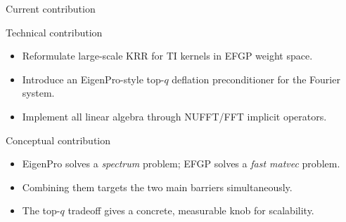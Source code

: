 \documentclass[aspectratio=169,11pt]{ctexbeamer}
\begin{document}
\begin{frame}{Current contribution}
\begin{block}{Technical contribution}
\begin{itemize}
  \item Reformulate large-scale KRR for TI kernels in EFGP weight space.
  \item Introduce an EigenPro-style top-$q$ deflation preconditioner for the Fourier system.
  \item Implement all linear algebra through NUFFT/FFT implicit operators.
\end{itemize}
\end{block}
\begin{block}{Conceptual contribution}
\begin{itemize}
  \item EigenPro solves a \emph{spectrum} problem; EFGP solves a \emph{fast matvec} problem.
  \item Combining them targets the two main barriers simultaneously.
  \item The top-$q$ tradeoff gives a concrete, measurable knob for scalability.
\end{itemize}
\end{block}
\begin{center}
\end{center}
\end{frame}
\end{document}
